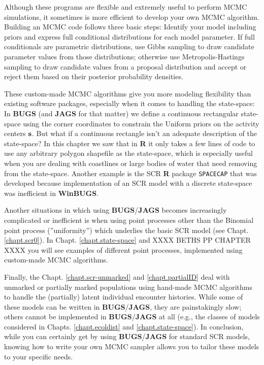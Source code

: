 Although these programs are flexible and extremely useful to perform MCMC simulations, it sometimes is more efficient to 
develop your own MCMC algorithm. Building an MCMC code follows three basic 
steps: Identify your model including priors and express full conditional 
distributions for each model parameter. If full conditionals are parametric 
distributions, use Gibbs sampling to draw candidate parameter values from 
those distributions; otherwise use Metropolis-Hastings sampling to draw 
candidate values from a proposal distribution and accept or reject them 
based on their posterior probability densities.

These custom-made MCMC algorithms give you more modeling flexibility than 
existing software packages, especially when it comes to handling the
 state-space: In {\bf BUGS} (and {\bf JAGS} for that matter) we define
  a continuous rectangular state-space using the corner coordinates to 
  constrain the Uniform priors on the activity centers ${\bf s}$.
   But what if a continuous rectangle isn't an adequate description of 
   the state-space? In this chapter we saw that in {\bf R} it only takes 
   a few lines of code to use any arbitrary polygon shapefile as the 
   state-space, which is especially useful when you are dealing with 
   coastlines or large bodies of water that need removing from the 
   state-space. Another example is the SCR {\bf R} package \mbox{\tt SPACECAP}
    \citep{gopalaswamy_etal:2011} that was developed because implementation
     of an SCR model with a discrete state-space was inefficient in {\bf WinBUGS}.
     
Another situations in which using {\bf BUGS}/{\bf JAGS} becomes
increasingly
complicated or inefficient is when using point processes other 
than the 
 Binomial point process (''uniformity'') which underlies the basic 
 SCR model (see Chapt. \ref {chapt.scr0}). In Chapt. 
 \ref {chapt.state-space} and XXXX BETHS PP CHAPTER XXXX you will see examples of different point processes,
  implemented using custom-made MCMC algorithms.

Finally, the Chapt. \ref {chapt.scr-unmarked} and \ref {chapt.partialID} deal with unmarked or 
partially marked populations using hand-made MCMC algorithms to 
handle the (partially) latent individual encounter histories. 
While some of these models can be written in {\bf BUGS}/{\bf JAGS}, they are painstakingly slow; others cannot be implemented in 
 {\bf BUGS}/{\bf JAGS} at all (e.g., the classes of models
 considered in Chapts. \ref{chapt.ecoldist} and  \ref{chapt.state-space}).
In conclusion, while you can certainly get by using {\bf BUGS}/{\bf JAGS} 
for standard SCR models, knowing how to write your own MCMC sampler 
allows you to tailor these models to your specific needs.

